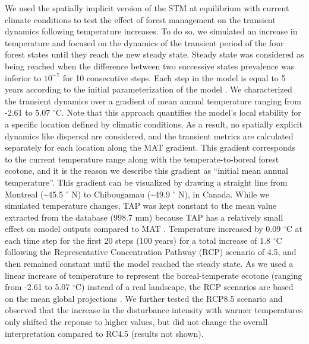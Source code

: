 We used the spatially implicit version of the STM at equilibrium with
current climate conditions to test the effect of forest management on
the transient dynamics following temperature increases. To do so, we
simulated an increase in temperature and focused on the dynamics of the
transient period of the four forest states until they reach the new
steady state. Steady state was considered as being reached when the
difference between two successive states prevalence was inferior to
\(10^{-7}\) for 10 consecutive steps. Each step in the model is equal to
5 years according to the initial parameterization of the model
\citep{Vissault2020}. We characterized the transient dynamics over a
gradient of mean annual temperature ranging from -2.61 to 5.07
\(^{\circ}\)C. Note that this approach quantifies the model's local
stability for a specific location defined by climatic conditions. As a
result, no spatially explicit dynamics like dispersal are considered,
and the transient metrics are calculated separately for each location
along the MAT gradient. This gradient corresponds to the current
temperature range along with the temperate-to-boreal forest ecotone, and
it is the reason we describe this gradient as ``initial mean annual
temperature''. This gradient can be visualized by drawing a straight
line from Montreal (\textasciitilde45.5 \(^{\circ}\) N) to Chibougamau
(\textasciitilde49.9 \(^{\circ}\) N), in Canada. While we simulated
temperature changes, TAP was kept constant to the mean value extracted
from the database (998.7 mm) because TAP has a relatively small effect
on model outputs compared to MAT \citep{Vissault2020}. Temperature
increased by 0.09 \(^{\circ}\)C at each time step for the first 20 steps
(100 years) for a total increase of 1.8 \(^{\circ}\)C following the
Representative Concentration Pathway (RCP) scenario of 4.5, and then
remained constant until the model reached the steady state. As we used a
linear increase of temperature to represent the boreal-temperate ecotone
(ranging from -2.61 to 5.07 \(^{\circ}\)C) instead of a real landscape,
the RCP scenarios are based on the mean global projections
\citep{IPCC2013}. We further tested the RCP8.5 scenario and observed
that the increase in the disturbance intensity with warmer temperatures
only shifted the reponse to higher values, but did not change the
overall interpretation compared to RC4.5 (results not shown).\\

